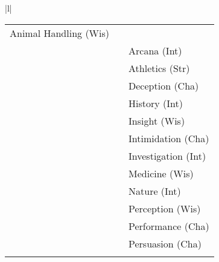 \begin{tabular}{|l|}
\begin{tabular}{l r l}
{\scriptsize Animal Handling} {\tiny(Wis)} \\
%
{\scriptsize \dndProfCircle{\DndIsProficientArcana}} &
{\scriptsize \ifthenelse{\DndArcanaMod<0}{}{+}\DndArcanaMod} &
{\scriptsize Arcana} {\tiny(Int)} \\
%
{\scriptsize \dndProfCircle{\DndIsProficientAthletics}} &
{\scriptsize \ifthenelse{\DndAthleticsMod<0}{}{+}\DndAthleticsMod} &
{\scriptsize Athletics} {\tiny(Str)} \\
%
{\scriptsize \dndProfCircle{\DndIsProficientDeception}} &
{\scriptsize \ifthenelse{\DndDeceptionMod<0}{}{+}\DndDeceptionMod} &
{\scriptsize Deception} {\tiny(Cha)} \\
%
{\scriptsize \dndProfCircle{\DndIsProficientHistory}} &
{\scriptsize \ifthenelse{\DndHistoryMod<0}{}{+}\DndHistoryMod} &
{\scriptsize History} {\tiny(Int)} \\
%
{\scriptsize \dndProfCircle{\DndIsProficientInsight}} &
{\scriptsize \ifthenelse{\DndInsightMod<0}{}{+}\DndInsightMod} &
{\scriptsize Insight} {\tiny(Wis)} \\
%
{\scriptsize \dndProfCircle{\DndIsProficientIntimidation}} &
{\scriptsize \ifthenelse{\DndIntimidationMod<0}{}{+}\DndIntimidationMod} &
{\scriptsize Intimidation} {\tiny(Cha)} \\
%
{\scriptsize \dndProfCircle{\DndIsProficientInvestigation}} &
{\scriptsize \ifthenelse{\DndInvestigationMod<0}{}{+}\DndInvestigationMod} &
{\scriptsize Investigation} {\tiny(Int)} \\
%
{\scriptsize \dndProfCircle{\DndIsProficientMedicine}} &
{\scriptsize \ifthenelse{\DndMedicineMod<0}{}{+}\DndMedicineMod} &
{\scriptsize Medicine} {\tiny(Wis)} \\
%
{\scriptsize \dndProfCircle{\DndIsProficientNature}} &
{\scriptsize \ifthenelse{\DndNatureMod<0}{}{+}\DndNatureMod} &
{\scriptsize Nature} {\tiny(Int)} \\
%
{\scriptsize \dndProfCircle{\DndIsProficientPerception}} &
{\scriptsize \ifthenelse{\DndPerceptionMod<0}{}{+}\DndPerceptionMod} &
{\scriptsize Perception} {\tiny(Wis)} \\
%
{\scriptsize \dndProfCircle{\DndIsProficientPerformance}} &
{\scriptsize \ifthenelse{\DndPerformanceMod<0}{}{+}\DndPerformanceMod} &
{\scriptsize Performance} {\tiny(Cha)} \\
%
{\scriptsize \dndProfCircle{\DndIsProficientPersuasion}} &
{\scriptsize \ifthenelse{\DndPersuasionMod<0}{}{+}\DndPersuasionMod} &
{\scriptsize Persuasion} {\tiny(Cha)} \\
%
{\scriptsize \dndProfCircle{\DndIsProficientReligion}} &

\end{tabular}
\end{tabular}

